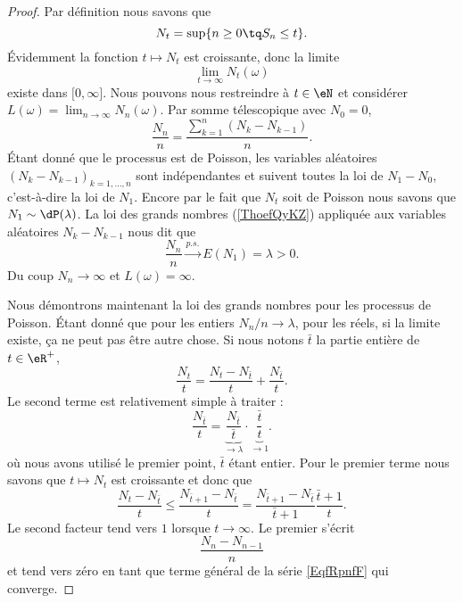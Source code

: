 \begin{proof}
	Par définition nous savons que
	\begin{equation}
		N_t=\sup\{ n\geq 0\tq S_n\leq t \}.
	\end{equation}
	Évidemment la fonction \( t\mapsto N_t\) est croissante, donc la limite
	\begin{equation}
		\lim_{t\to \infty} N_t(\omega)
	\end{equation}
	existe dans \( \mathopen[ 0 , \infty \mathclose]\). Nous pouvons nous restreindre à \( t\in \eN\) et considérer \( L(\omega)=\lim_{n\to \infty} N_n(\omega)\). Par somme télescopique avec \( N_0=0\),
	\begin{equation}    \label{EqfRpnfF}
		\frac{ N_n }{ n }=\frac{ \sum_{k=1}^n(N_k-N_{k-1}) }{ n }.
	\end{equation}
	Étant donné que le processus est de Poisson, les variables aléatoires \( (N_k-N_{k-1})_{k=1,\ldots, n}\) sont indépendantes et suivent toutes la loi de \( N_1-N_0\), c'est-à-dire la loi de \( N_1\). Encore par le fait que \( N_t\) soit de Poisson nous savons que \( N_1\sim\dP(\lambda)\). La loi des grands nombres (\ref{ThoefQyKZ}) appliquée aux variables aléatoires \( N_k-N_{k-1}\) nous dit que
	\begin{equation}
		\frac{ N_n }{ n }\stackrel{p.s.}{\longrightarrow}E(N_1)=\lambda>0.
	\end{equation}
	Du coup \( N_n\to \infty\) et \( L(\omega)=\infty\).

	Nous démontrons maintenant la loi des grands nombres pour les processus de Poisson. Étant donné que pour les entiers \( N_n/n\to \lambda\), pour les réels, si la limite existe, ça ne peut pas être autre chose. Si nous notons \( \bar t\) la partie entière de \( t\in \eR^+\),
	\begin{equation}
		\frac{ N_t }{ t }=\frac{ N_t-N_{\bar t} }{ t }+\frac{ N_{\bar t} }{ t }.
	\end{equation}
	Le second terme est relativement simple à traiter :
	\begin{equation}
		\frac{ N_{\bar t} }{ t }=\underbrace{\frac{ N_{\bar t} }{ \bar t }}_{\to \lambda}\cdot\underbrace{\frac{ \bar t }{ t }}_{\to 1}.
	\end{equation}
	où nous avons utilisé le premier point, \( \bar t\) étant entier. Pour le premier terme nous savons que \( t\mapsto N_t\) est croissante et donc que
	\begin{equation}
		\frac{ N_t-N_{\bar t} }{ t }\leq \frac{ N_{\bar t+1}-N_{\bar t}}{ t }=\frac{ N_{\bar t+1}-N_{\bar t} }{ \bar t+1 }\frac{ \bar t+1 }{ t }.
	\end{equation}
	Le second facteur tend vers \( 1\) lorsque \( t\to \infty\). Le premier s'écrit
	\begin{equation}    \label{eqtPgPpJ}
		\frac{ N_n-N_{n-1} }{ n }
	\end{equation}
	et tend vers zéro en tant que terme général de la série \eqref{EqfRpnfF} qui converge.
\end{proof}



